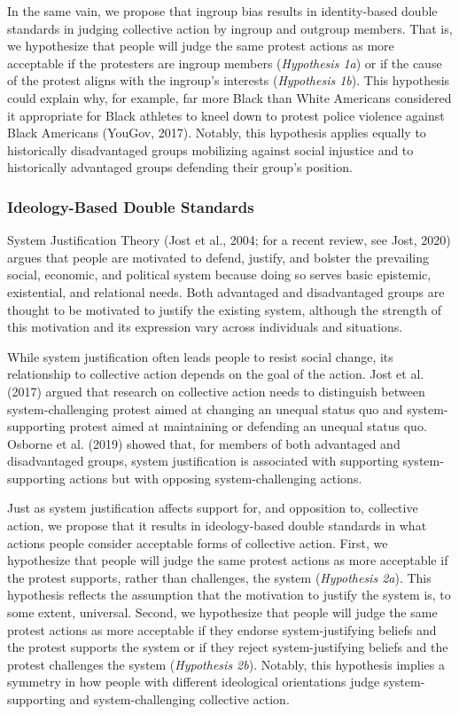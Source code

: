 \documentclass[twocolumn, 11pt, letterpaper]{article}
\begin{document}
In the same vain, we propose that ingroup bias results in identity-based
double standards in judging collective action by ingroup and outgroup
members. That is, we hypothesize that people will judge the same protest
actions as more acceptable if the protesters are ingroup members
(\emph{Hypothesis 1a}) or if the cause of the protest aligns with the
ingroup's interests (\emph{Hypothesis 1b}). This hypothesis could
explain why, for example, far more Black than White Americans considered
it appropriate for Black athletes to kneel down to protest police
violence against Black Americans (YouGov, 2017). Notably, this
hypothesis applies equally to historically disadvantaged groups
mobilizing against social injustice and to historically advantaged
groups defending their group's position.

\hypertarget{ideology-based-double-standards}{%
\subsubsection{Ideology-Based Double
Standards}\label{ideology-based-double-standards}}

System Justification Theory (Jost et al., 2004; for a recent review, see
Jost, 2020) argues that people are motivated to defend, justify, and
bolster the prevailing social, economic, and political system because
doing so serves basic epistemic, existential, and relational needs. Both
advantaged and disadvantaged groups are thought to be motivated to
justify the existing system, although the strength of this motivation
and its expression vary across individuals and situations.

While system justification often leads people to resist social change,
its relationship to collective action depends on the goal of the action.
Jost et al. (2017) argued that research on collective action needs to
distinguish between system-challenging protest aimed at changing an
unequal status quo and system-supporting protest aimed at maintaining or
defending an unequal status quo. Osborne et al. (2019) showed that, for
members of both advantaged and disadvantaged groups, system
justification is associated with supporting system-supporting actions
but with opposing system-challenging actions.

Just as system justification affects support for, and opposition to,
collective action, we propose that it results in ideology-based double
standards in what actions people consider acceptable forms of collective
action. First, we hypothesize that people will judge the same protest
actions as more acceptable if the protest supports, rather than
challenges, the system (\emph{Hypothesis 2a}). This hypothesis reflects
the assumption that the motivation to justify the system is, to some
extent, universal. Second, we hypothesize that people will judge the
same protest actions as more acceptable if they endorse
system-justifying beliefs and the protest supports the system or if they
reject system-justifying beliefs and the protest challenges the system
(\emph{Hypothesis 2b}). Notably, this hypothesis implies a symmetry in
how people with different ideological orientations judge
system-supporting and system-challenging collective action.
\end{document}
